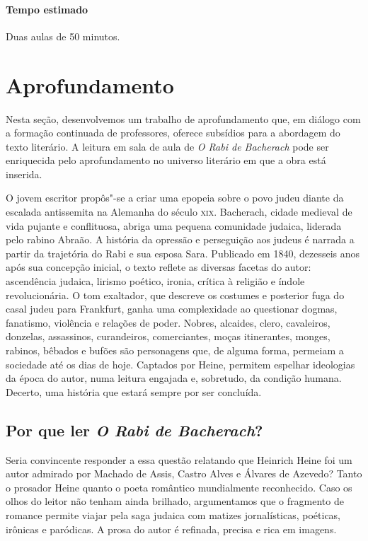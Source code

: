\documentclass[12pt]{extarticle}
\begin{document}
\paragraph{Tempo estimado} Duas aulas de 50 minutos.


\section{Aprofundamento}

Nesta seção, desenvolvemos um trabalho de aprofundamento que, em diálogo
com a formação continuada de professores, oferece subsídios para a
abordagem do texto literário. A leitura em sala de aula de \emph{O Rabi
de Bacherach} pode ser enriquecida pelo aprofundamento no universo
literário em que a obra está inserida.

O jovem escritor propôs"-se a criar uma epopeia sobre o
povo judeu diante da escalada antissemita na Alemanha do século \textsc{xix}.
Bacherach, cidade medieval de vida pujante e conflituosa, abriga uma
pequena comunidade judaica, liderada pelo rabino Abraão. A história da
opressão e perseguição aos judeus é narrada a partir da trajetória do
Rabi e sua esposa Sara. Publicado em 1840, dezesseis anos após sua
concepção inicial, o texto reflete as diversas facetas do autor:
ascendência judaica, lirismo poético, ironia, crítica à religião e
índole revolucionária. O tom exaltador, que descreve os costumes e
posterior fuga do casal judeu para Frankfurt, ganha uma complexidade ao
questionar dogmas, fanatismo, violência e relações de poder.
Nobres, alcaides, clero, cavaleiros, donzelas, assassinos, curandeiros,
comerciantes, moças itinerantes, monges, rabinos, bêbados e bufões são
personagens que, de alguma forma, permeiam a sociedade até os dias de
hoje. Captados por Heine, permitem espelhar ideologias da época do
autor, numa leitura engajada e, sobretudo, da condição humana. Decerto,
uma história que estará sempre por ser concluída.

\subsection{Por que ler \textit{O Rabi de Bacherach}?}

Seria convincente responder a essa questão relatando que Heinrich Heine
foi um autor admirado por Machado de Assis, Castro Alves e Álvares de
Azevedo? Tanto o prosador Heine quanto o poeta romântico mundialmente
reconhecido. Caso os olhos do leitor não tenham ainda brilhado,
argumentamos que o fragmento de romance permite viajar pela saga judaica
com matizes jornalísticas, poéticas, irônicas e paródicas. A prosa do
autor é refinada, precisa e rica em imagens.
\end{document}
